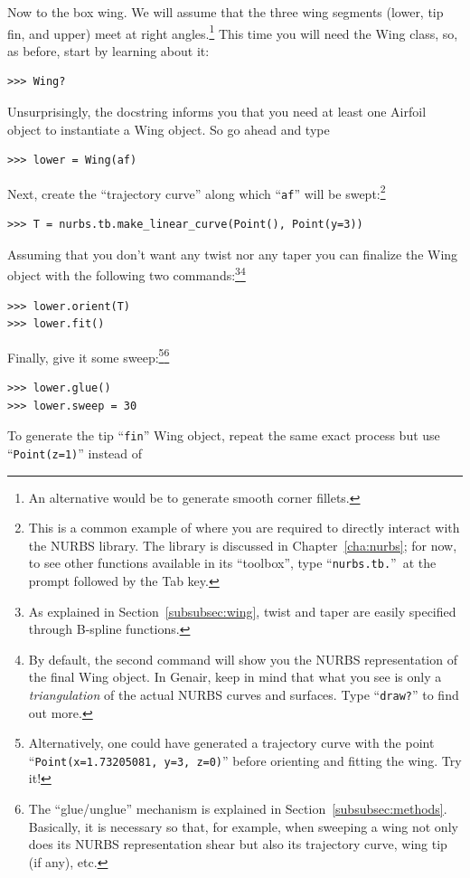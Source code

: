 \documentclass[]{article}
\begin{document}
Now to the box wing.  We will assume that the three wing segments 
(lower, tip fin, and upper) meet at right angles.\footnote{An 
alternative would be to generate smooth corner fillets.}  This time you 
will need the Wing class, so, as before, start by learning about it:
\begin{verbatim}
>>> Wing?
\end{verbatim}
Unsurprisingly, the docstring informs you that you need at least one 
Airfoil object to instantiate a Wing object.  So go ahead and type
\begin{verbatim}
>>> lower = Wing(af)
\end{verbatim}
Next, create the ``trajectory curve'' along which ``\texttt{af}'' will 
be swept:\footnote{This is a common example of where you are required to 
directly interact with the NURBS library.  The library is discussed in 
Chapter~\ref{cha:nurbs}; for now, to see other functions available in 
its ``toolbox'', type ``\texttt{nurbs.tb.}''\ at the prompt followed by 
the Tab key.}
\begin{verbatim}
>>> T = nurbs.tb.make_linear_curve(Point(), Point(y=3))
\end{verbatim}
Assuming that you don't want any twist nor any taper you can finalize 
the Wing object with the following two commands:\footnote{As explained 
in Section~\ref{subsubsec:wing}, twist and taper are easily specified 
through B-spline functions.}\footnote{By default, the second command 
will show you the NURBS representation of the final Wing object.  In 
Genair, keep in mind that what you see is only a \emph{triangulation} of 
the actual NURBS curves and surfaces.  Type ``\texttt{draw?}'' to find 
out more.}
\begin{verbatim}
>>> lower.orient(T)
>>> lower.fit()
\end{verbatim}
Finally, give it some sweep:\footnote{Alternatively, one could have 
generated a trajectory curve with the point 
``\texttt{Point(x=1.73205081, y=3, z=0)}'' before orienting and fitting 
the wing.  Try it!}\footnote{The ``glue/unglue'' mechanism is explained 
in Section~\ref{subsubsec:methods}.  Basically, it is necessary so that, 
for example, when sweeping a wing not only does its NURBS representation 
shear but also its trajectory curve, wing tip (if any), etc.}
\begin{verbatim}
>>> lower.glue()
>>> lower.sweep = 30
\end{verbatim}
To generate the tip ``\texttt{fin}'' Wing object, repeat the same exact 
process but use ``\texttt{Point(z=1)}'' instead of 
\end{document}
